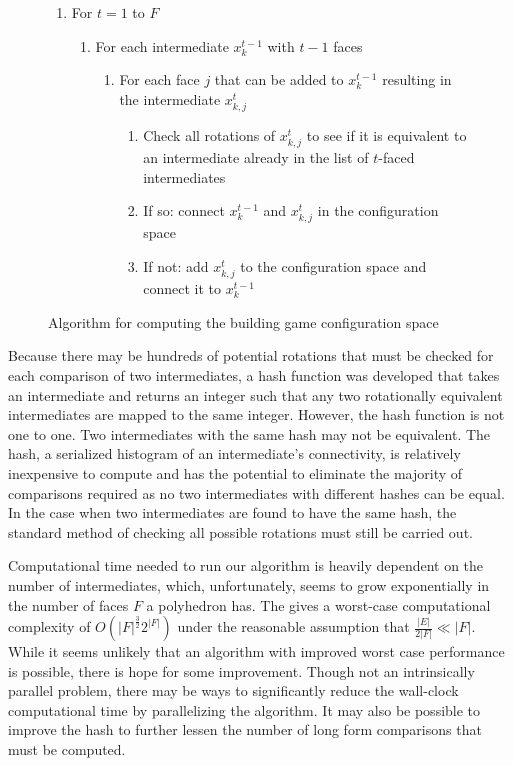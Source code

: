 \documentclass[12pt]{article}
\begin{document}
\begin{figure}[h]
\begin{enumerate}
\item For $t = 1$ to $F$
\begin{enumerate}
\item For each intermediate $x^{t-1}_k$ with $t-1$ faces
\begin{enumerate}
\item For each face $j$ that can be added to $x^{t-1}_k$ resulting in the intermediate $x^{t}_{k,j}$
\begin{enumerate}
\item Check all rotations of $x^{t}_{k,j}$ to see if it is equivalent to an intermediate already in the list of $t$-faced intermediates
\item If so: connect $x^{t-1}_{k}$ and $x^{t}_{k,j}$ in the configuration space
\item If not: add $x^{t}_{k,j}$ to the configuration space and connect it to $x^{t-1}_{k}$
\end{enumerate}
\end{enumerate}
\end{enumerate}
\end{enumerate}
\caption{Algorithm for computing the building game configuration space}
\label{code_alg}
\end{figure}

Because there may be hundreds of potential rotations that must be checked for each comparison of two intermediates, a hash function was developed that takes an intermediate and returns an integer such that any two rotationally equivalent intermediates are mapped to the same integer. However, the hash function is not one to one. Two intermediates with the same hash may not be equivalent. The hash, a serialized histogram of an intermediate's connectivity, is relatively inexpensive to compute and has the potential to eliminate the majority of comparisons required as no two intermediates with different hashes can be equal. In the case when two intermediates are found to have the same hash, the standard method of checking all possible rotations must still be carried out. 

Computational time needed to run our algorithm is heavily dependent on the number of intermediates, which, unfortunately, seems to grow exponentially in the number of faces $F$ a polyhedron has. The gives a worst-case computational complexity of $O\left(|F|^{\frac{3}{2}}2^{|F|}\right)$ under the reasonable assumption that $\frac{|E|}{2|F|} \ll |F|$. While it seems unlikely that an algorithm with improved worst case performance is possible, there is hope for some improvement. Though not an intrinsically parallel problem, there may be ways to significantly reduce the wall-clock computational time by parallelizing the algorithm. It may also be possible to improve the hash to further lessen the number of long form comparisons that must be computed.
\end{document}
